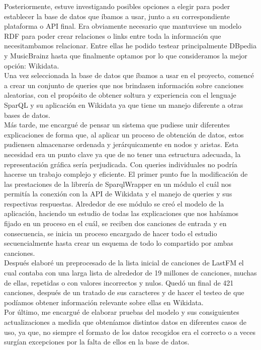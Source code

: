 Posteriormente, estuve investigando posibles opciones a elegir para poder establecer la base de datos que íbamos a usar, junto a su correspondiente plataforma o API final. Era obviamente necesario que mantuviese un modelo RDF para poder crear relaciones o links entre toda la información que necesitambamos relacionar. Entre ellas he podido testear principalmente DBpedia y MusicBrainz hasta que finalmente optamos por lo que consideramos la mejor opción: Wikidata.\\

Una vez seleccionada la base de datos que íbamos a usar en el proyecto, comencé a crear un conjunto de queries que nos brindasen información sobre canciones aleatorias, con el propósito de obtener soltura y experiencia con el lenguaje SparQL y su aplicación en Wikidata ya que tiene un manejo diferente a otras bases de datos.\\

Más tarde, me encargué de pensar un sistema que pudiese unir diferentes explicaciones de forma que, al aplicar un proceso de obtención de datos, estos pudiensen almacenarse ordenada y jerárquicamente en nodos y aristas. Esta necesidad era un punto clave ya que de no tener una estructura adecuada, la representación gráfica sería perjudicada. Con queries individuales no podría hacerse un trabajo complejo y eficiente. El primer punto fue la modificación de las prestaciones de la librería de SparqlWrapper en un módulo el cuál nos permitía la conexión con la API de Wikidata y el manejo de queries y sus respectivas respuestas. Alrededor de ese módulo se creó el modelo de la aplicación, haciendo un estudio de todas las explicaciones que nos habíamos fijado en un proceso en el cuál, se reciben dos canciones de entrada y en consecuencia, se inicia un proceso encargado de hacer todo el estudio secuencialmente hasta crear un esquema de todo lo compartido por ambas canciones.\\

Después elaboré un preprocesado de la lista inicial de canciones de LastFM el cual contaba con una larga lista de alrededor de 19 millones de canciones, muchas de ellas, repetidas o con valores incorrectos y nulos. Quedó un final de 421 canciones, después de un tratado de sus caracteres y de hacer el testeo de que podíamos obtener información relevante sobre ellas en Wikidata.\\

Por último, me encargué de elaborar pruebas del modelo y sus consiguientes actualizaciones a medida que obteníamos distintos datos en diferentes casos de uso, ya que, no siempre el formato de los datos recogidos era el correcto o a veces surgían excepciones por la falta de ellos en la base de datos.\\


